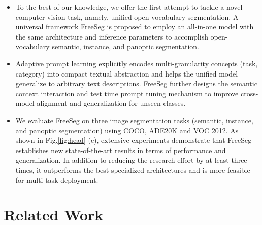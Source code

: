 \documentclass[10pt,twocolumn,letterpaper]{article}
\begin{document}
\begin{itemize} [ itemsep = 1.0pt]

\item  To the best of our knowledge, we offer the first attempt to tackle a novel computer vision task, namely, unified open-vocabulary segmentation. A universal framework FreeSeg is proposed to employ an all-in-one model with the same architecture and inference parameters to accomplish open-vocabulary semantic, instance, and panoptic segmentation.


\item  Adaptive prompt learning explicitly encodes
multi-granularity concepts (task, category) into compact textual abstraction and helps the unified model generalize to arbitrary text descriptions.
FreeSeg further designs the semantic context interaction and test time prompt tuning mechanism to improve cross-model alignment and generalization for unseen classes.


\item We evaluate FreeSeg on three image segmentation tasks (semantic, instance, and panoptic segmentation) using COCO, ADE20K and VOC 2012. As shown in Fig.\ref{fig:head} (c), extensive experiments demonstrate that FreeSeg establishes new state-of-the-art results in terms of performance and generalization.
In addition to reducing the research effort by at least three times, it outperforms the best-specialized architectures and is more feasible for multi-task deployment.


  \end{itemize}



\section{Related Work}
\end{document}
